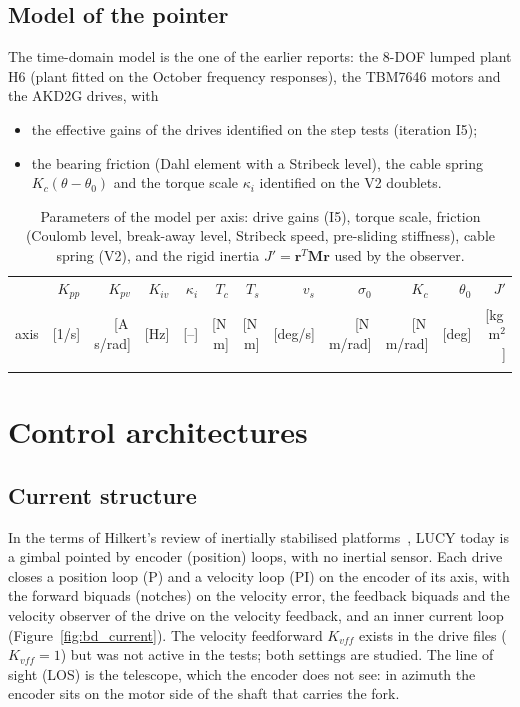 \documentclass[10pt,a4paper]{article}
\numberwithin{equation}{section}
\begin{document}
\subsection{Model of the pointer}
The time-domain model is the one of the earlier reports: the 8-DOF lumped plant H6 (plant fitted on the October frequency responses), the TBM7646 motors and the AKD2G drives, with
\begin{itemize}
\item the effective gains of the drives identified on the step tests (iteration I5);
\item the bearing friction (Dahl element with a Stribeck level), the cable spring $K_c(\theta-\theta_0)$ and the torque scale $\kappa_i$ identified on the V2 doublets.
\end{itemize}
\begin{table}[H]\centering\scriptsize\setlength{\tabcolsep}{3pt}
\caption{Parameters of the model per axis: drive gains (I5), torque scale, friction (Coulomb level, break-away level, Stribeck speed, pre-sliding stiffness), cable spring (V2), and the rigid inertia $J'=\mathbf r^T\mathbf M\mathbf r$ used by the observer.}\label{tab:model}
\begin{tabular}{lrrrrrrrrrrr}\toprule
& $K_{pp}$ & $K_{pv}$ & $K_{iv}$ & $\kappa_i$ & $T_c$ & $T_s$ & $v_s$ & $\sigma_0$ & $K_c$ & $\theta_0$ & $J'$ \\
axis & [1/s] & [A\,s/rad] & [Hz] & [--] & [N\,m] & [N\,m] & [deg/s] & [N\,m/rad] & [N\,m/rad] & [deg] & [kg\,m$^2$] \\ \midrule
\\ \bottomrule
\end{tabular}\end{table}

\section{Control architectures}\label{sec:arch}
\subsection{Current structure}
In the terms of Hilkert's review of inertially stabilised platforms~\cite{hilkert2008}, LUCY today is a gimbal pointed by encoder (position) loops, with no inertial sensor. Each drive closes a position loop (P) and a velocity loop (PI) on the encoder of its axis, with the forward biquads (notches) on the velocity error, the feedback biquads and the velocity observer of the drive on the velocity feedback, and an inner current loop (Figure~\ref{fig:bd_current}). The velocity feedforward $K_{vff}$ exists in the drive files ($K_{vff}=1$) but was not active in the tests; both settings are studied. The line of sight (LOS) is the telescope, which the encoder does not see: in azimuth the encoder sits on the motor side of the shaft that carries the fork.
\end{document}
